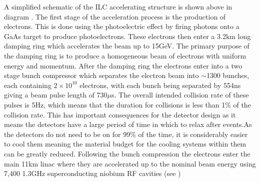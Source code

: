 A simplified schematic of the \ac{ILC} accelerating structure is shown above in diagram . The first stage of the acceleration process is the production of electrons. This is done using the photoelectric effect by firing photons onto a GaAs target to produce photoelectrons. These electrons then enter a 3.2km long damping ring which accelerates the beam up to 15GeV. The primary purpose of the damping ring is to produce a homogeneous beam of electrons with uniform energy and momentum. After the damping ring the electrons enter into a two stage bunch compressor which separates the electron beam into ${\sim}$1300 bunches, each containing ${2\times10^{10}}$ electrons, with each bunch being separated by 554ns giving a beam pulse length of 730${\mu}$s. The overall intended collision rate of these pulses is 5Hz, which means that the duration for collisions is less than 1\% of the collision rate. This has important consequences for the detector design as it means the detectors have a large period of time in which to relax after events.As the detectors do not need to be on for 99\% of the time, it is considerably easier to cool them meaning the material budget for the cooling systems within them can be greatly reduced. Following the bunch compression the electrons enter the main 11km linac where they are accelerated up to the nominal beam energy using 7,400 1.3GHz superconducting niobium \ac{RF} cavities (see ) 

